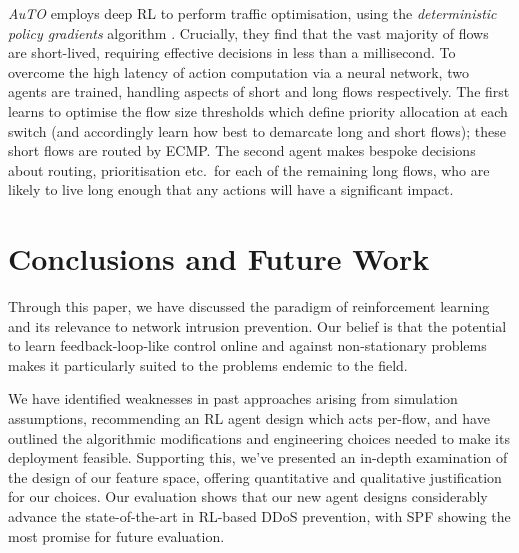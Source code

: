 \documentclass[conference, a4paper, 10pt, times]{IEEEtran}
\begin{document}
\emph{AuTO} \cite{DBLP:conf/sigcomm/ChenL0L18} employs deep RL to perform traffic optimisation, using the \emph{deterministic policy gradients} algorithm \cite{DBLP:conf/icml/SilverLHDWR14}.
Crucially, they find that the vast majority of flows are short-lived, requiring effective decisions in less than a millisecond.
To overcome the high latency of action computation via a neural network, two agents are trained, handling aspects of short and long flows respectively.
The first learns to optimise the flow size thresholds which define priority allocation at each switch (and accordingly learn how best to demarcate long and short flows); these short flows are routed by ECMP.
The second agent makes bespoke decisions about routing, prioritisation etc.\ for each of the remaining long flows, who are likely to live long enough that any actions will have a significant impact.



\section{Conclusions and Future Work}

Through this paper, we have discussed the paradigm of reinforcement learning and its relevance to network intrusion prevention.
Our belief is that the potential to learn feedback-loop-like control online and against non-stationary problems makes it particularly suited to the problems endemic to the field.

We have identified weaknesses in past approaches arising from simulation assumptions, recommending an RL agent design which acts per-flow, and have outlined the algorithmic modifications and engineering choices needed to make its deployment feasible.
Supporting this, we've presented an in-depth examination of the design of our feature space, offering quantitative and qualitative justification for our choices.
Our evaluation shows that our new agent designs considerably advance the state-of-the-art in RL-based DDoS prevention, with SPF showing the most promise for future evaluation.


\end{document}
